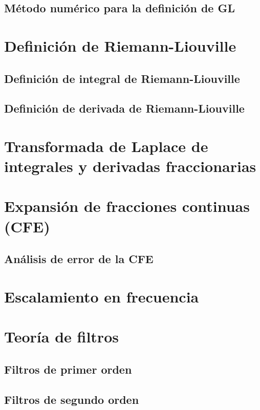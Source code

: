 		\subsection{Método numérico para la definición de GL}

	\section{Definición de Riemann-Liouville}

		\subsection{Definición de integral de Riemann-Liouville}
		
		\subsection{Definición de derivada de Riemann-Liouville}
		
	\section{Transformada de Laplace de integrales y derivadas fraccionarias}
	
	\section{Expansión de fracciones continuas (CFE)}\label{sec:CFE}
	
	\subsection{Análisis de error de la CFE}
	                                                                 
	\section{Escalamiento en frecuencia}

	\section{Teoría de filtros}
	
		\subsection{Filtros de primer orden}
	
		\subsection{Filtros de segundo orden}
	